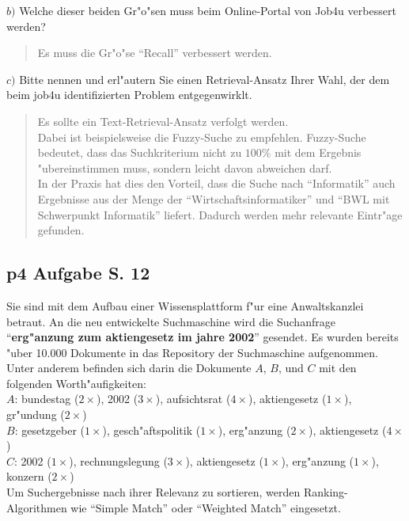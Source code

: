 \noindent
$b)$ Welche dieser beiden Gr"o"sen muss beim Online-Portal von Job4u verbessert werden?\\
\begin{quote}
    Es muss die Gr"o"se "`Recall"' verbessert werden.\\
\end{quote}


\noindent
$c)$ Bitte nennen und erl"autern Sie einen Retrieval-Ansatz Ihrer Wahl, der dem beim job4u identifizierten Problem entgegenwirklt.\\

\begin{quote}
    Es sollte ein Text-Retrieval-Ansatz verfolgt werden.\\
    Dabei ist beispielsweise die Fuzzy-Suche zu empfehlen.
    Fuzzy-Suche bedeutet, dass das Suchkriterium nicht zu $100\%$ mit dem Ergebnis "ubereinstimmen muss, sondern leicht davon abweichen darf.\\
    In der Praxis hat dies den Vorteil, dass die Suche nach "`Informatik"' auch Ergebnisse aus der Menge der "`Wirtschaftsinformatiker"' und "`BWL mit Schwerpunkt Informatik"' liefert. Dadurch werden mehr relevante Eintr"age gefunden.
\end{quote}


\subsection{p4 Aufgabe S. 12}
Sie sind mit dem Aufbau einer Wissensplattform f"ur eine Anwaltskanzlei betraut.
An die neu entwickelte Suchmaschine wird die Suchanfrage "`\textbf{erg"anzung zum aktiengesetz im jahre 2002}"' gesendet.
Es wurden bereits "uber  10.000 Dokumente in das Repository der Suchmaschine aufgenommen.
Unter anderem befinden sich darin die Dokumente $A$, $B$, und $C$ mit den folgenden Worth"aufigkeiten:\\

\noindent
$A$: bundestag ($2\times$), 2002 ($3\times$), aufsichtsrat ($4\times$), aktiengesetz ($1\times$), gr"undung ($2\times$)\\
$B$: gesetzgeber ($1\times$), gesch"aftspolitik ($1\times$), erg"anzung ($2\times$), aktiengesetz ($4\times$)\\
$C$: 2002 ($1\times$), rechnungslegung ($3\times$), aktiengesetz ($1\times$), erg"anzung ($1\times$), konzern ($2\times$)\\

\noindent
Um Suchergebnisse nach ihrer Relevanz zu sortieren, werden Ranking-Algorithmen wie "`Simple Match"' oder "`Weighted Match"' eingesetzt.\\

